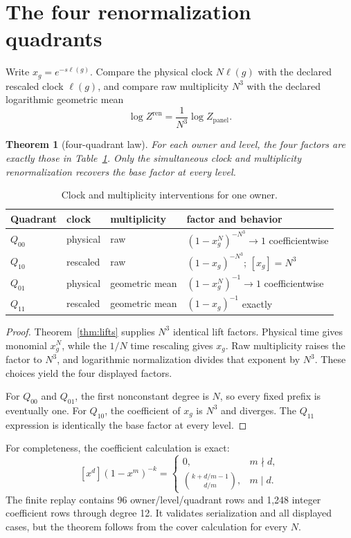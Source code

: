 \documentclass[11pt]{article}
\newtheorem{theorem}{Theorem}[section]
\theoremstyle{definition}
\theoremstyle{remark}
\begin{document}
\section{The four renormalization quadrants}

Write $x_g=e^{-s\ell(g)}$. Compare the physical clock $N\ell(g)$ with the declared rescaled clock $\ell(g)$, and compare raw multiplicity $N^3$ with the declared logarithmic geometric mean
\[
\log Z^{\mathrm{ren}}=\frac1{N^3}\log Z_{\mathrm{panel}}.
\]

\begin{theorem}[four-quadrant law]\label{thm:quadrants}
For each owner and level, the four factors are exactly those in Table~\ref{tab:quadrants}. Only the simultaneous clock and multiplicity renormalization recovers the base factor at every level.
\end{theorem}

\begin{table}[ht]
\centering
\caption{Clock and multiplicity interventions for one owner.}
\label{tab:quadrants}
\begin{tabular}{llll}
\toprule
Quadrant & clock & multiplicity & factor and behavior\\
\midrule
$Q_{00}$ & physical & raw & $(1-x_g^N)^{-N^3}\to1$ coefficientwise\\
$Q_{10}$ & rescaled & raw & $(1-x_g)^{-N^3}$; $[x_g]=N^3$\\
$Q_{01}$ & physical & geometric mean & $(1-x_g^N)^{-1}\to1$ coefficientwise\\
$Q_{11}$ & rescaled & geometric mean & $(1-x_g)^{-1}$ exactly\\
\bottomrule
\end{tabular}
\end{table}

\begin{proof}
Theorem~\ref{thm:lifts} supplies $N^3$ identical lift factors. Physical time gives monomial $x_g^N$, while the $1/N$ time rescaling gives $x_g$. Raw multiplicity raises the factor to $N^3$, and logarithmic normalization divides that exponent by $N^3$. These choices yield the four displayed factors.

For $Q_{00}$ and $Q_{01}$, the first nonconstant degree is $N$, so every fixed prefix is eventually one. For $Q_{10}$, the coefficient of $x_g$ is $N^3$ and diverges. The $Q_{11}$ expression is identically the base factor at every level.
\end{proof}

For completeness, the coefficient calculation is exact:
\[
[x^d](1-x^m)^{-k}=
\begin{cases}
0,&m\nmid d,\\
\binom{k+d/m-1}{d/m},&m\mid d.
\end{cases}
\]
The finite replay contains 96 owner/level/quadrant rows and 1,248 integer coefficient rows through degree 12. It validates serialization and all displayed cases, but the theorem follows from the cover calculation for every $N$.
\end{document}
